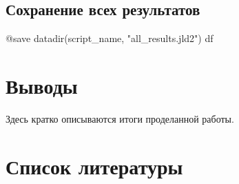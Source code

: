 \documentclass[
  12pt,
  a4paper,
  DIV=11,
  numbers=noendperiod]{scrreprt}
\newenvironment{Shaded}{\begin{snugshade}}{\end{snugshade}}
\newcommand{\FunctionTok}[1]{\textcolor[rgb]{0.28,0.35,0.67}{#1}}
\newcommand{\NormalTok}[1]{\textcolor[rgb]{0.00,0.23,0.31}{#1}}
\newcommand{\PreprocessorTok}[1]{\textcolor[rgb]{0.68,0.00,0.00}{#1}}
\newcommand{\StringTok}[1]{\textcolor[rgb]{0.13,0.47,0.30}{#1}}
\begin{document}
\section{Сохранение всех
результатов}\label{ux441ux43eux445ux440ux430ux43dux435ux43dux438ux435-ux432ux441ux435ux445-ux440ux435ux437ux443ux43bux44cux442ux430ux442ux43eux432}

\begin{Shaded}
\begin{Highlighting}[]
\PreprocessorTok{@save} \FunctionTok{datadir}\NormalTok{(script\_name, }\StringTok{"all\_results.jld2"}\NormalTok{) df}
\end{Highlighting}
\end{Shaded}

\chapter{Выводы}\label{ux432ux44bux432ux43eux434ux44b}

Здесь кратко описываются итоги проделанной работы.

\chapter*{Список
литературы}\label{ux441ux43fux438ux441ux43eux43a-ux43bux438ux442ux435ux440ux430ux442ux443ux440ux44b}

\printbibliography[heading=none]
\end{document}
